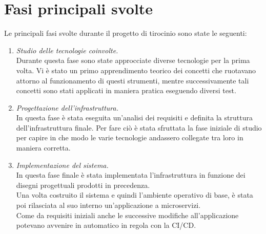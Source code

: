 \documentclass[a4paper,12pt]{report}
\begin{document}
\section{Fasi principali svolte}
Le principali fasi svolte durante il progetto di tirocinio sono state le seguenti:
\begin{enumerate}
\item \textit{Studio delle tecnologie coinvolte.} \\
Durante questa fase sono state approcciate diverse tecnologie per la prima volta. Vi è stato un primo apprendimento teorico dei concetti che ruotavano attorno al funzionamento di questi strumenti, mentre successivamente tali concetti sono stati applicati in maniera pratica eseguendo diversi test.
\item \textit{Progettazione dell'infrastruttura.} \\
In questa fase è stata eseguita un'analisi dei requisiti e definita la struttura dell'infrastruttura finale. Per fare ciò è stata sfruttata la fase iniziale di studio per capire in che modo le varie tecnologie andassero collegate tra loro in maniera corretta.
\item \textit{Implementazione del sistema.}\\
In questa fase finale è stata implementata l'infrastruttura in funzione dei disegni progettuali prodotti in precedenza.\\
Una volta costruito il sistema e quindi l'ambiente operativo di base, è stata poi rilasciata al suo interno un'applicazione a microservizi. \\
Come da requisiti iniziali anche le successive modifiche all'applicazione potevano avvenire in automatico in regola con la CI/CD. \\
\end{enumerate}
\end{document}
